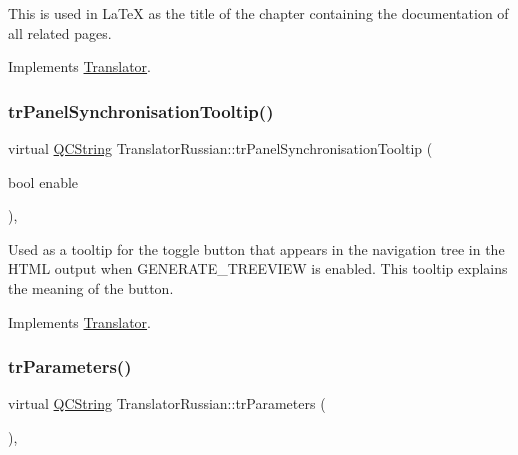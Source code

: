 This is used in La\+TeX as the title of the chapter containing the documentation of all related pages. 

Implements \mbox{\hyperlink{class_translator}{Translator}}.

\mbox{\label{class_translator_russian_aa0d87f5b3ea4327e64d798857150bbff}} 
\subsubsection{\texorpdfstring{trPanelSynchronisationTooltip()}{trPanelSynchronisationTooltip()}}
{\footnotesize\ttfamily virtual \mbox{\hyperlink{class_q_c_string}{Q\+C\+String}} Translator\+Russian\+::tr\+Panel\+Synchronisation\+Tooltip (\begin{DoxyParamCaption}\item[{bool}]{enable }\end{DoxyParamCaption})\hspace{0.3cm}{\ttfamily [inline]}, {\ttfamily [virtual]}}

Used as a tooltip for the toggle button that appears in the navigation tree in the H\+T\+ML output when G\+E\+N\+E\+R\+A\+T\+E\+\_\+\+T\+R\+E\+E\+V\+I\+EW is enabled. This tooltip explains the meaning of the button. 

Implements \mbox{\hyperlink{class_translator}{Translator}}.

\mbox{\label{class_translator_russian_a9a0eb4cce92fdbc5eaf78c13034af958}} 
\subsubsection{\texorpdfstring{trParameters()}{trParameters()}}
{\footnotesize\ttfamily virtual \mbox{\hyperlink{class_q_c_string}{Q\+C\+String}} Translator\+Russian\+::tr\+Parameters (\begin{DoxyParamCaption}{ }\end{DoxyParamCaption})\hspace{0.3cm}{\ttfamily [inline]}, {\ttfamily [virtual]}}

